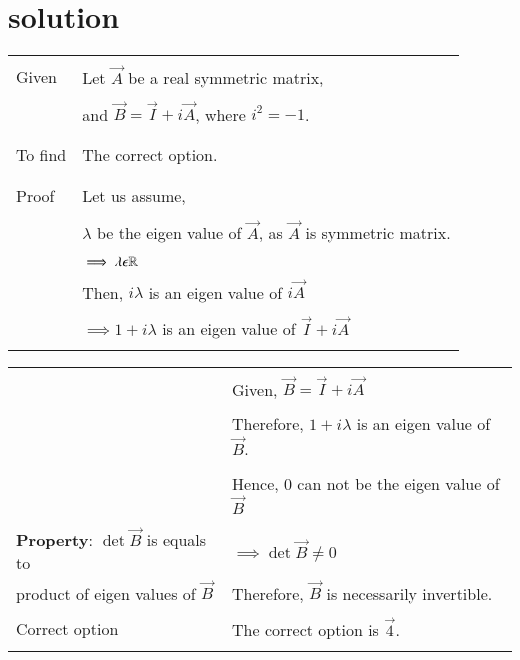 \documentclass[journal,12pt,twocolumn]{IEEEtran}
\begin{document}
\section{solution}
\begin{table}[h!]
\begin{center}
\begin{tabular}{|p{5cm}|p{10cm}|}
\hline
& \\
Given &Let $\vec{A}$ be a real symmetric matrix,\\\\& and $\vec{B}=\vec{I}+i\vec{A}$, where $i^2=-1$.\\
&\\
\hline
&\\
To find  & The correct option.\\
&\\
 \hline
& \\
Proof  & Let us assume,\\\\ & $\lambda$ be the eigen value of $\vec{A}$, as $\vec{A}$ is symmetric matrix.\\
&\\
& $\implies \lambda\epsilon \mathbb{R}$\\
&\\
& Then, $i\lambda$ is an eigen value of $i\vec{A}$\\
&\\
& $\implies 1+i\lambda$ is an eigen value of $\vec{I}+i\vec{A}$ \\
& \\
\hline
\end{tabular}
\end{center}
\end{table}
\newpage
\begin{table}[ht]
\begin{center}
\begin{tabular}{|p{5cm}|p{10cm}|}
\hline
&\\
& Given, $\vec{B}=\vec{I}+i\vec{A}$\\\\
& Therefore, $1+i\lambda$ is an eigen value of $\vec{B}$.\\
&\\
& Hence, 0 can not be the eigen value of $\vec{B}$\\
&\\
\textbf{Property}: $\det\vec{B}$ is equals to 
& $\implies \det\vec{B} \neq 0$\\product of eigen values of $\vec{B}$
& Therefore, $\vec{B}$ is necessarily invertible.
&\\
\hline
&\\
Correct option  & The correct option is $\vec{4}$.\\
&\\
\hline
\end{tabular}
\end{center}
\end{table}
\end{document}
